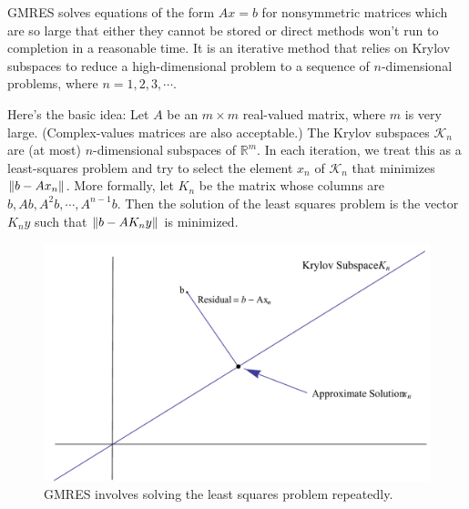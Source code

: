 \label{lab:GMRES}

GMRES solves equations of the form $Ax=b$ for nonsymmetric matrices which are so large that either they cannot be stored or direct methods won't run to completion in a reasonable time.
It is an iterative method that relies on Krylov subspaces to reduce a high-dimensional problem to a sequence of $n$-dimensional problems, where $n=1,2,3,\cdots$.

Here's the basic idea: Let $A$ be an $m\times m$ real-valued matrix, where $m$ is very large.
(Complex-values matrices are also acceptable.)
The Krylov subspaces $\mathcal{K}_n$ are (at most) $n$-dimensional subspaces of $\mathbb{R}^m$.
In each iteration, we treat this as a least-squares problem and try to select the element $x_n$ of $\mathcal{K}_n$ that minimizes $\left\lVert b - A x_n\right\rVert$.
More formally, let $K_n$ be the matrix whose columns are $b,Ab,A^{2}b,\cdots, A^{n-1}b$.
Then the solution of the least squares problem is the vector $K_{n}y$ such that $\left\lVert b-A K_{n}y\right\rVert$ is minimized.

\begin{figure}
\includegraphics[width=.7\textwidth]{LeastSquares}
\caption{GMRES involves solving the least squares problem repeatedly.}
\end{figure}

